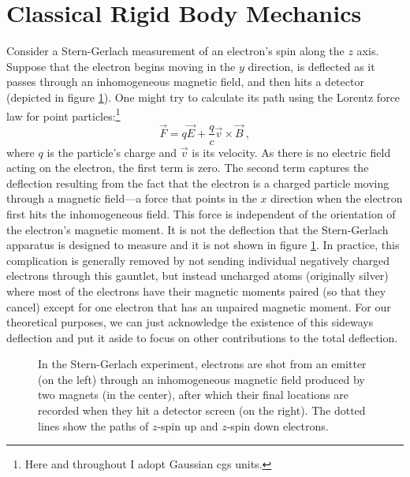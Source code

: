\documentclass[12pt,secnumarabic,amsmath,amssymb,balancelastpage,nofootinbib]{article}
\begin{document}
\section{Classical Rigid Body Mechanics}\label{rigidbodysection}

Consider a Stern-Gerlach measurement of an electron's spin along the $z$ axis.  Suppose that the electron begins moving in the $y$ direction, is deflected as it passes through an inhomogeneous magnetic field, and then hits a detector (depicted in figure \ref{SGsetup}).  One might try to calculate its path using the Lorentz force law for point particles:\footnote{Here and throughout I adopt Gaussian cgs units.}
\begin{equation}
\vec{F}= q  \vec{E} + \frac{q}{c} \vec{v} \times \vec{B}
\ ,
\label{pforcelaw}
\end{equation}
where $q$ is the particle's charge and $\vec{v}$ is its velocity.  As there is no electric field acting on the electron, the first term is zero.  The second term captures the deflection resulting from the fact that the electron is a charged particle moving through a magnetic field---a force that points in the $x$ direction when the electron first hits the inhomogeneous field.  This force is independent of the orientation of the electron's magnetic moment.  It is not the deflection that the Stern-Gerlach apparatus is designed to measure and it is not shown in figure \ref{SGsetup}.  In practice, this complication is generally removed by not sending individual negatively charged electrons through this gauntlet, but instead uncharged atoms (originally silver) where most of the electrons have their magnetic moments paired (so that they cancel) except for one electron that has an unpaired magnetic moment.  For our theoretical purposes, we can just acknowledge the existence of this sideways deflection and put it aside to focus on other contributions to the total deflection.

\begin{figure}[p!]
\caption{In the Stern-Gerlach experiment, electrons are shot from an emitter (on the left) through an inhomogeneous magnetic field produced by two magnets (in the center), after which their final locations are recorded when they hit a detector screen (on the right).  The dotted lines show the paths of $z$-spin up and $z$-spin down electrons.}
  \label{SGsetup}
\end{figure}
\end{document}
